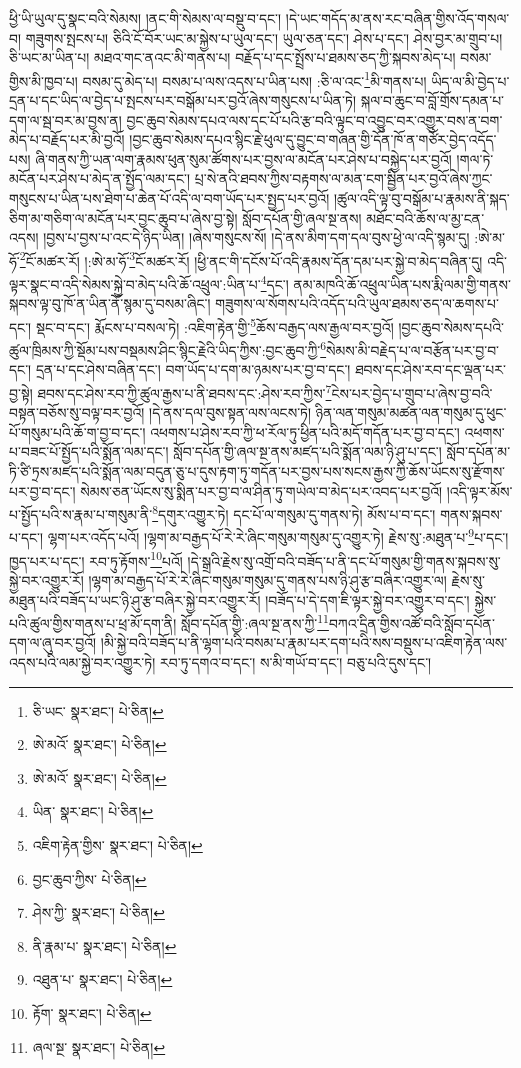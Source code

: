 ཕྱི་ཡི་ཡུལ་དུ་སྣང་བའི་སེམས། །ནང་གི་སེམས་ལ་བསྡུ་བ་དང་། །དེ་ཡང་གདོད་མ་ནས་རང་བཞིན་གྱིས་འོད་གསལ་བ། གཟུགས་སྤངས་པ། ཅིའི་ངོ་བོར་ཡང་མ་སྐྱེས་པ་ཡུལ་དང་། ཡུལ་ཅན་དང་། ཤེས་པ་དང་། ཤེས་བྱར་མ་གྲུབ་པ། ཅི་ཡང་མ་ཡིན་པ། མཐའ་གང་ནའང་མི་གནས་པ། བརྗོད་པ་དང་སྤྲོས་པ་ཐམས་ཅད་ཀྱི་སྐབས་མེད་པ། བསམ་གྱིས་མི་ཁྱབ་པ། བསམ་དུ་མེད་པ། བསམ་པ་ལས་འདས་པ་ཡིན་པས། :ཅི་ལ་འང་\footnote{ཅི་ཡང་  སྣར་ཐང་།  པེ་ཅིན། }མི་གནས་པ། ཡིད་ལ་མི་བྱེད་པ་དྲན་པ་དང་ཡིད་ལ་བྱེད་པ་སྤངས་པར་བསྒོམ་པར་བྱའོ་ཞེས་གསུངས་པ་ཡིན་ཏེ། སྐལ་བ་ཆུང་བ་བློ་གྲོས་དམན་པ་དག་ལ་སྦ་བར་མ་བྱས་ན། བྱང་ཆུབ་སེམས་དཔའ་ལས་དང་པོ་པའི་རྩ་བའི་ལྟུང་བ་འབྱུང་བར་འགྱུར་བས་ན་བག་མེད་པ་བརྗོད་པར་མི་བྱའོ། །བྱང་ཆུབ་སེམས་དཔའ་སྙིང་རྗེ་ཕུལ་དུ་བྱུང་བ་གཞན་གྱི་དོན་ཁོ་ན་གཙོར་བྱེད་འདོད་པས། ཞི་གནས་ཀྱི་ཡན་ལག་རྣམས་ཕུན་སུམ་ཚོགས་པར་བྱས་ལ་མངོན་པར་ཤེས་པ་བསྐྱེད་པར་བྱའོ། །གལ་ཏེ་མངོན་པར་ཤེས་པ་མེད་ན་སྤྱོད་ལམ་དང་། པྲ་སེ་ནའི་ཐབས་ཀྱིས་བརྟགས་ལ་མན་ངག་སྦྱིན་པར་བྱའོ་ཞེས་ཀྱང་གསུངས་པ་ཡིན་པས་ཐེག་པ་ཆེན་པོ་འདི་ལ་བག་ཡོད་པར་སྤྱད་པར་བྱའོ། །ཚུལ་འདི་ལྟ་བུ་བསྒོམ་པ་རྣམས་ནི་སྐད་ཅིག་མ་གཅིག་ལ་མངོན་པར་བྱང་ཆུབ་པ་ཞེས་བྱ་སྟེ། སློབ་དཔོན་གྱི་ཞལ་སྔ་ནས། མཐོང་བའི་ཆོས་ལ་མྱ་ངན་འདས། །བྱས་པ་བྱས་པ་འང་དེ་ཉིད་ཡིན། །ཞེས་གསུངས་སོ། །དེ་ནས་མིག་དག་དལ་བུས་ཕྱེ་ལ་འདི་སྙམ་དུ། :ཨེ་མ་ཧོ་\footnote{ཨེ་མའོ་  སྣར་ཐང་།  པེ་ཅིན། }ངོ་མཚར་རོ། །:ཨེ་མ་ཧོ་\footnote{ཨེ་མའོ་  སྣར་ཐང་།  པེ་ཅིན། }ངོ་མཚར་རོ། །ཕྱི་ནང་གི་དངོས་པོ་འདི་རྣམས་དོན་དམ་པར་སྐྱེ་བ་མེད་བཞིན་དུ། འདི་ལྟར་སྣང་བ་འདི་སེམས་སྐྱེ་བ་མེད་པའི་ཆོ་འཕྲུལ་:ཡིན་པ་\footnote{ཡིན་  སྣར་ཐང་།  པེ་ཅིན། }དང་། ནམ་མཁའི་ཆོ་འཕྲུལ་ཡིན་པས་རྨི་ལམ་གྱི་གནས་སྐབས་ལྟ་བུ་ཁོ་ན་ཡིན་ནོ་སྙམ་དུ་བསམ་ཞིང་། གཟུགས་ལ་སོགས་པའི་འདོད་པའི་ཡུལ་ཐམས་ཅད་ལ་ཆགས་པ་དང་། སྡང་བ་དང་། རྨོངས་པ་བསལ་ཏེ། :འཇིག་རྟེན་གྱི་\footnote{འཇིག་རྟེན་གྱིས་  སྣར་ཐང་།  པེ་ཅིན། }ཆོས་བརྒྱད་ལས་རྒྱལ་བར་བྱའོ། །བྱང་ཆུབ་སེམས་དཔའི་ཚུལ་ཁྲིམས་ཀྱི་སྡོམ་པས་བསྡམས་ཤིང་སྙིང་རྗེའི་ཡིད་ཀྱིས་:བྱང་ཆུབ་ཀྱི་\footnote{བྱང་ཆུབ་ཀྱིས་  པེ་ཅིན། }སེམས་མི་བརྗེད་པ་ལ་བརྩོན་པར་བྱ་བ་དང་། དྲན་པ་དང་ཤེས་བཞིན་དང་། བག་ཡོད་པ་དག་མ་ཉམས་པར་བྱ་བ་དང་། ཐབས་དང་ཤེས་རབ་དང་ལྡན་པར་བྱ་སྟེ། ཐབས་དང་ཤེས་རབ་ཀྱི་ཚུལ་རྒྱས་པ་ནི་ཐབས་དང་:ཤེས་རབ་ཀྱིས་\footnote{ཤེས་ཀྱི་  སྣར་ཐང་།  པེ་ཅིན། }ངེས་པར་བྱེད་པ་གྲུབ་པ་ཞེས་བྱ་བའི་བསྟན་བཅོས་སུ་བལྟ་བར་བྱའོ། །དེ་ནས་དལ་བུས་སྟན་ལས་ལངས་ཏེ། ཉིན་ལན་གསུམ་མཚན་ལན་གསུམ་དུ་ཕུང་པོ་གསུམ་པའི་ཆོ་ག་བྱ་བ་དང་། འཕགས་པ་ཤེས་རབ་ཀྱི་ཕ་རོལ་ཏུ་ཕྱིན་པའི་མདོ་གདོན་པར་བྱ་བ་དང་། འཕགས་པ་བཟང་པོ་སྤྱོད་པའི་སྨོན་ལམ་དང་། སློབ་དཔོན་གྱི་ཞལ་སྔ་ནས་མཛད་པའི་སྨོན་ལམ་ཉི་ཤུ་པ་དང་། སློབ་དཔོན་མ་ཏི་ཙི་ཏྲས་མཛད་པའི་སྨོན་ལམ་བདུན་ཅུ་པ་དུས་རྟག་ཏུ་གདོན་པར་བྱས་པས་སངས་རྒྱས་ཀྱི་ཆོས་ཡོངས་སུ་རྫོགས་པར་བྱ་བ་དང་། སེམས་ཅན་ཡོངས་སུ་སྨིན་པར་བྱ་བ་ལ་ཤིན་ཏུ་གཡེལ་བ་མེད་པར་འབད་པར་བྱའོ། །འདི་ལྟར་མོས་པ་སྤྱོད་པའི་ས་རྣམ་པ་གསུམ་ནི་\footnote{ནི་རྣམ་པ་  སྣར་ཐང་།  པེ་ཅིན། }དགུར་འགྱུར་ཏེ། དང་པོ་ལ་གསུམ་དུ་གནས་ཏེ། མོས་པ་བ་དང་། གནས་སྐབས་པ་དང་། ལྷག་པར་འདོད་པའོ། །ལྷག་མ་བརྒྱད་པོ་རེ་རེ་ཞིང་གསུམ་གསུམ་དུ་འགྱུར་ཏེ། རྗེས་སུ་:མཐུན་པ་\footnote{འཐུན་པ་  སྣར་ཐང་།  པེ་ཅིན། }པ་དང་། ཁྱད་པར་པ་དང་། རབ་ཏུ་རྟོགས་\footnote{རྟོག་  སྣར་ཐང་།  པེ་ཅིན། }པའོ། །དེ་སྒྲའི་རྗེས་སུ་འགྲོ་བའི་བཟོད་པ་ནི་དང་པོ་གསུམ་གྱི་གནས་སྐབས་སུ་སྐྱེ་བར་འགྱུར་རོ། །ལྷག་མ་བརྒྱད་པོ་རེ་རེ་ཞིང་གསུམ་གསུམ་དུ་གནས་པས་ཉི་ཤུ་རྩ་བཞིར་འགྱུར་ལ། རྗེས་སུ་མཐུན་པའི་བཟོད་པ་ཡང་ཉི་ཤུ་རྩ་བཞིར་སྐྱེ་བར་འགྱུར་རོ། །བཟོད་པ་དེ་དག་ཇི་ལྟར་སྐྱེ་བར་འགྱུར་བ་དང་། སྐྱེས་པའི་ཚུལ་གྱིས་གནས་པ་ཕྲ་མོ་དག་ནི། སློབ་དཔོན་གྱི་:ཞལ་སྔ་ནས་ཀྱི་\footnote{ཞལ་སྔ་  སྣར་ཐང་།  པེ་ཅིན། }བཀའ་དྲིན་གྱིས་འཚོ་བའི་སློབ་དཔོན་དག་ལ་ཞུ་བར་བྱའོ། །མི་སྐྱེ་བའི་བཟོད་པ་ནི་ལྷག་པའི་བསམ་པ་རྣམ་པར་དག་པའི་སས་བསྡུས་པ་འཇིག་རྟེན་ལས་འདས་པའི་ལམ་སྐྱེ་བར་འགྱུར་ཏེ། རབ་ཏུ་དགའ་བ་དང་། ས་མི་གཡོ་བ་དང་། བཅུ་པའི་དུས་དང་། 